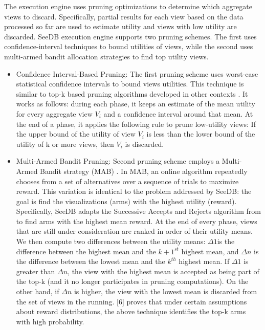 {The execution engine uses pruning optimizations to determine 
which aggregate views to discard. Specifically, partial results for each 
view based on the data processed so far are used to estimate utility and views 
with low utility are discarded. SeeDB execution engine supports two pruning schemes. 
The first uses confidence-interval techniques to bound utilities of views, while the second 
uses multi-armed bandit allocation strategies to find top utility views.\\
 \begin{itemize}
\item {Confidence Interval-Based Pruning:} The first pruning scheme uses worst-case statistical confidence intervals to bound views utilities. 
 This technique is similar to top-k based pruning algorithms developed in other contexts \cite{serfling1974probability}. 
 It works as follows: during each phase, 
 it keeps an estimate of the mean utility for every aggregate view $V_i$ and a confidence 
 interval around that mean. At the end of a phase, it applies the following rule to 
 prune low-utility views: If the upper bound of the utility of view $V_i$ is less than the lower bound 
 of the utility of k or more views, then $V_i$ is discarded. 
\item {Multi-Armed Bandit Pruning:} Second pruning scheme employs a Multi-Armed Bandit strategy (MAB)
\cite{DBLP:journals/pvldb/VartakMPP14,DBLP:conf/icml/BubeckWV13}. 
In MAB, an online algorithm repeatedly chooses from a set of alternatives over 
a sequence of trials to maximize reward. 
This variation is identical to the problem addressed by SeeDB: the goal is find the 
visualizations (arms) with the highest utility (reward). 
Specifically, SeeDB adapts the Successive Accepts and Rejects algorithm from \cite{DBLP:conf/icml/BubeckWV13}
to find arms with the highest mean reward. At the end of every 
phase, views that are still under consideration are ranked in order of their 
utility means. We then compute two differences between the utility means: $\Delta {1} $is the difference 
between the highest mean and the $k + 1^{st}$ highest mean, and $\Delta{n}$ is the difference between 
the lowest mean and the ${k}^{th}$ highest mean. If $\Delta {1}$ is greater than $ \Delta{n}$, the view with the 
highest mean is accepted as being part of the top-k (and it no longer participates in pruning computations). 
On the other hand, if $ \Delta{n}$ is higher, the view with the lowest mean is discarded from the set of 
views in the running. [6] proves that under certain assumptions about reward distributions, 
the above technique identifies the top-k arms with high probability.
 

\end{itemize}}
